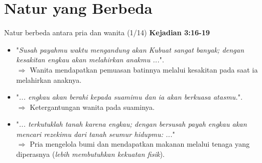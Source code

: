 \documentclass{beamer}
\theoremstyle{mystyle}
\begin{document}
\section{Natur yang Berbeda}
\begin{frame}{Natur berbeda antara pria dan wanita (1/14)}
	    \textbf{Kejadian 3:16-19}
	    \begin{itemize}
	    	\item<2-> "\textit{Susah payahmu waktu mengandung akan Kubuat sangat banyak; dengan kesakitan engkau akan melahirkan anakmu ...}". \\
	    	\onslide<3-> $\Longrightarrow$ Wanita mendapatkan pemuasan batinnya melalui kesakitan pada saat ia melahirkan anaknya.
	    	\item<4-> "\textit{... engkau akan berahi kepada suamimu dan ia akan berkuasa atasmu.}". \\
	    	\onslide<5-> $\Longrightarrow$ Ketergantungan wanita pada suaminya. \\
	    	\item<6-> "\textit{... terkutuklah tanah karena engkau; dengan bersusah payah engkau akan mencari rezekimu dari tanah seumur hidupmu: ...}" \\
	    	\onslide<7-> $\Longrightarrow$ Pria mengelola bumi dan mendapatkan makanan melalui tenaga yang diperasnya (\textit{lebih membutuhkan kekuatan fisik}).
	    \end{itemize}
\end{frame}

%		
%
%		
%		
\end{document}
